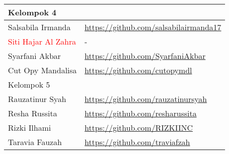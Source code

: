 \documentclass[a4paper]{tufte-handout}
\begin{document}
\begin{projects}
\begin{description}
\begin{table}[!ht]
\begin{tabular}{ll}
\midrule
Kelompok 4\\
\midrule
Salsabila Irmanda		& \url{https://github.com/salsabilairmanda17} \\
\textcolor{red}{Siti Hajar Al Zahra	}	& - \\
Syarfani Akbar			& \url{https://github.com/SyarfaniAkbar} \\
Cut Opy Mandalisa		& \url{https://github.com/cutopymdl} \\
\midrule
Kelompok 5\\
\midrule
Rauzatinur Syah			& \url{https://github.com/rauzatinursyah} \\
Resha Russita			& \url{https://github.com/resharussita} \\
Rizki Ilhami			& \url{https://github.com/RIZKIINC} \\
Taravia Fauzah			& \url{https://github.com/traviafzah} \\
\midrule
\end{tabular}
\end{table}
	\end{description}
\end{projects}

\end{document}
